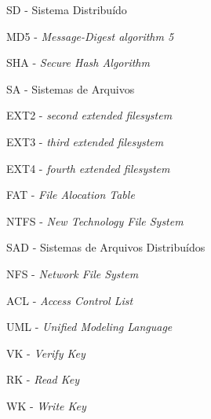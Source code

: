 \item SD - Sistema Distribuído
\item MD5 - \textit{Message-Digest algorithm 5}
\item SHA - \textit{Secure Hash Algorithm}
\item SA - Sistemas de Arquivos
\item EXT2 - \textit{second extended filesystem}
\item EXT3 - \textit{third extended filesystem}
\item EXT4 - \textit{fourth extended filesystem}
\item FAT - \textit{File Alocation Table}
\item NTFS - \textit{New Technology File System}
\item SAD - Sistemas de Arquivos Distribuídos
\item NFS - \textit{Network File System} 
\item ACL - \textit{Access Control List}
\item UML - \textit{Unified Modeling Language}
\item VK - \textit{Verify Key}
\item RK - \textit{Read Key}
\item WK - \textit{Write Key}


